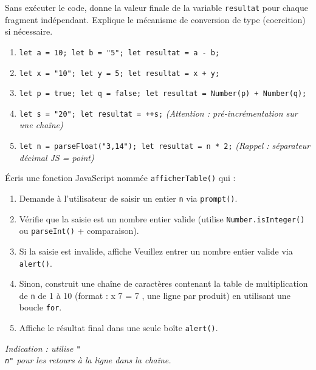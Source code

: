 \documentclass[11pt]{article}
\newcounter{popsec}
\newcounter{popsub}
\newcommand{\courssub}[1]{%
  \stepcounter{popsub}%
  \par\vspace{9pt}\noindent{\popxbold\fontsize{11.5}{13}\selectfont\color{popink}{\color{poporange}\thepopsec.\thepopsub}\hspace{6pt}#1}\par\nopagebreak\vspace{4pt}
}
\begin{document}
\begin{exercice}
Sans exécuter le code, donne la valeur finale de la variable \texttt{resultat} pour chaque fragment indépendant. Explique le mécanisme de conversion de type (coercition) si nécessaire.
\begin{enumerate}
    \item \texttt{let a = 10; let b = "5"; let resultat = a - b;}
    \item \texttt{let x = "10"; let y = 5; let resultat = x + y;}
    \item \texttt{let p = true; let q = false; let resultat = Number(p) + Number(q);}
    \item \texttt{let s = "20"; let resultat = ++s;} \textit{(Attention : pré-incrémentation sur une chaîne)}
    \item \texttt{let n = parseFloat("3,14"); let resultat = n * 2;} \textit{(Rappel : séparateur décimal JS = point)}
\end{enumerate}
\end{exercice}

\courssub{Je m'entraîne}

\begin{exercice}
Écris une fonction JavaScript nommée \texttt{afficherTable()} qui :
\begin{enumerate}
    \item Demande à l'utilisateur de saisir un entier \texttt{n} via \texttt{prompt()}.
    \item Vérifie que la saisie est un nombre entier valide (utilise \texttt{Number.isInteger()} ou \texttt{parseInt()} + comparaison).
    \item Si la saisie est invalide, affiche \guillemotleft Veuillez entrer un nombre entier valide \guillemotright via \texttt{alert()}.
    \item Sinon, construit une chaîne de caractères contenant la table de multiplication de \texttt{n} de 1 à 10 (format :  x 7 = 7 \guillemotright, une ligne par produit) en utilisant une boucle \texttt{for}.
    \item Affiche le résultat final dans une seule boîte \texttt{alert()}.
\end{enumerate}
\textit{Indication : utilise \texttt{"\\n"} pour les retours à la ligne dans la chaîne.}
\end{exercice}
\end{document}
